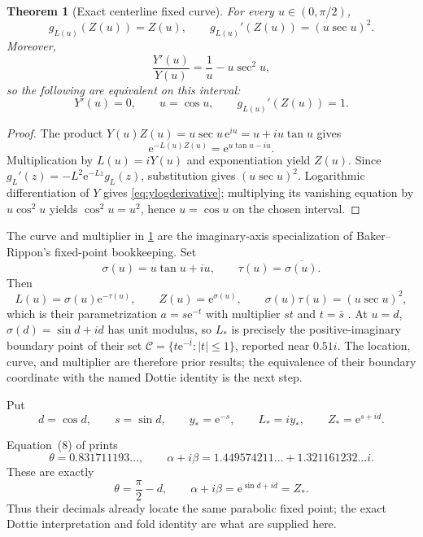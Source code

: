 \documentclass[11pt]{article}
\newtheorem{theorem}{Theorem}[section]
\theoremstyle{definition}
\theoremstyle{remark}
\newcommand{\e}{\mathrm e}
\begin{document}
\begin{theorem}[Exact centerline fixed curve]\label{thm:fixedcurve}
For every $u\in(0,\pi/2)$,
\begin{equation}
  g_{L(u)}(Z(u))=Z(u),
  \qquad
  g_{L(u)}'(Z(u))=(u\sec u)^2.
  \label{eq:fixed-multiplier}
\end{equation}
Moreover,
\begin{equation}
  \frac{Y'(u)}{Y(u)}=\frac1u-u\sec^2u,
  \label{eq:ylogderivative}
\end{equation}
so the following are equivalent on this interval:
\begin{equation}
  Y'(u)=0,
  \qquad u=\cos u,
  \qquad g_{L(u)}'(Z(u))=1.
  \label{eq:dottie-equivalence}
\end{equation}
\end{theorem}

\begin{proof}
The product $Y(u)Z(u)=u\sec u\,\e^{iu}=u+iu\tan u$ gives
\[
  \e^{-L(u)Z(u)}=\e^{u\tan u-iu}.
\]
Multiplication by $L(u)=iY(u)$ and exponentiation yield $Z(u)$.  Since
$g_L'(z)=-L^2\e^{-Lz}g_L(z)$, substitution gives $(u\sec u)^2$.  Logarithmic differentiation of $Y$ gives \cref{eq:ylogderivative}; multiplying its vanishing equation by $u\cos^2u$ yields $\cos^2u=u^2$, hence $u=\cos u$ on the chosen interval.
\end{proof}

The curve and multiplier in \cref{thm:fixedcurve} are the imaginary-axis specialization of Baker--Rippon's fixed-point bookkeeping.  Set
\[
  \sigma(u)=u\tan u+iu,
  \qquad \tau(u)=\overline{\sigma(u)}.
\]
Then
\[
  L(u)=\sigma(u)\e^{-\tau(u)},
  \qquad Z(u)=\e^{\sigma(u)},
  \qquad \sigma(u)\tau(u)=(u\sec u)^2,
\]
which is their parametrization $a=s\e^{-t}$ with multiplier $st$ and $t=\bar s$ \citep[eqs.~(12)--(13), pp.~195--196]{BakerRippon1989Composite}.  At $u=d$, $\sigma(d)=\sin d+id$ has unit modulus, so $L_*$ is precisely the positive-imaginary boundary point of their set $\mathcal C=\{t\e^{-\bar t}:|t|\le1\}$, reported near $0.51i$.  The location, curve, and multiplier are therefore prior results; the equivalence of their boundary coordinate with the named Dottie identity is the next step.

Put
\begin{equation}
  d=\cos d,\qquad s=\sin d,\qquad
  y_*=\e^{-s},\qquad L_*=iy_*,
  \qquad Z_*=\e^{s+id}.
  \label{eq:dottie-data}
\end{equation}

Equation~(8) of \citet[p.~189]{BakerRippon1989Composite} prints
\[
  \theta=0.831711193\ldots,
  \qquad \alpha+i\beta
  =1.449574211\ldots+1.321161232\ldots i.
\]
These are exactly
\[
  \theta=\frac\pi2-d,
  \qquad \alpha+i\beta=\e^{\sin d+id}=Z_*.
\]
Thus their decimals already locate the same parabolic fixed point; the exact Dottie interpretation and fold identity are what are supplied here.
\end{document}
